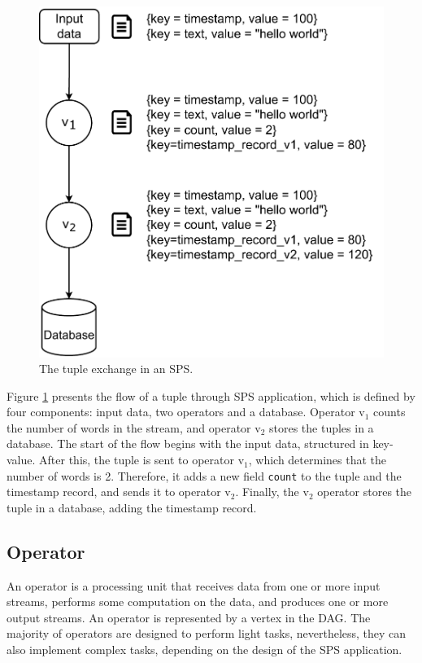 \begin{figure}[ht!]
  \centering
    \includegraphics[scale=0.6]{figures/concepts/SPS-Tuple.pdf}
  \caption{The tuple exchange in an SPS.}
  \label{fig:sps-tuple}
\end{figure}

Figure \ref{fig:sps-tuple} presents the flow of a tuple through SPS application, which is defined by four components: input data, two operators and a database. Operator $\text{v}_1$ counts the number of words in the stream, and operator $\text{v}_2$ stores the tuples in a database. The start of the flow begins with the input data, structured in key-value. After this, the tuple is sent to operator $\text{v}_1$, which determines that the number of words is 2. Therefore, it adds a new field \texttt{count} to the tuple and the timestamp record, and sends it to operator $\text{v}_2$. Finally, the $\text{v}_2$ operator stores the tuple in a database, adding the timestamp record.


\subsection{Operator}
An operator is a processing unit that receives data from one or more input streams, performs some computation on the data, and produces one or more output streams. An operator is represented by a vertex in the DAG. The majority of operators are designed to perform light tasks, nevertheless, they can also implement complex tasks, depending on the design of the SPS application.

